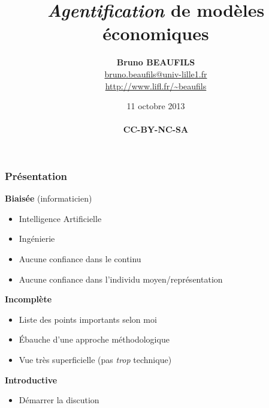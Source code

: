 \documentclass{beamer}
\title{\emph{Agentification} de modèles économiques}
\author{\textbf{Bruno BEAUFILS}\\
\footnotesize\url{bruno.beaufils@univ-lille1.fr}\\
\url{http://www.lifl.fr/~beaufils}}
\date{11 octobre 2013\\{\ccbyncsa}\\\textbf{\tiny CC-BY-NC-SA}}
\begin{document}
\maketitle


\begin{frame}
  \frametitle{Présentation}

  \textbf{Biaisée} (informaticien)

  \begin{itemize}
  \item Intelligence Artificielle 
  \item Ingénierie 
  \item Aucune confiance dans le continu
  \item Aucune confiance dans l'individu moyen/représentation
  \end{itemize}

  \textbf{Incomplète}
  \begin{itemize}
  \item Liste des points importants selon moi
  \item Ébauche d'une approche méthodologique
  \item Vue très superficielle (pas \emph{trop} technique)
  \end{itemize}

  \textbf{Introductive}
  \begin{itemize}
  \item Démarrer la discution
  \end{itemize}
\end{frame}

\end{document}
